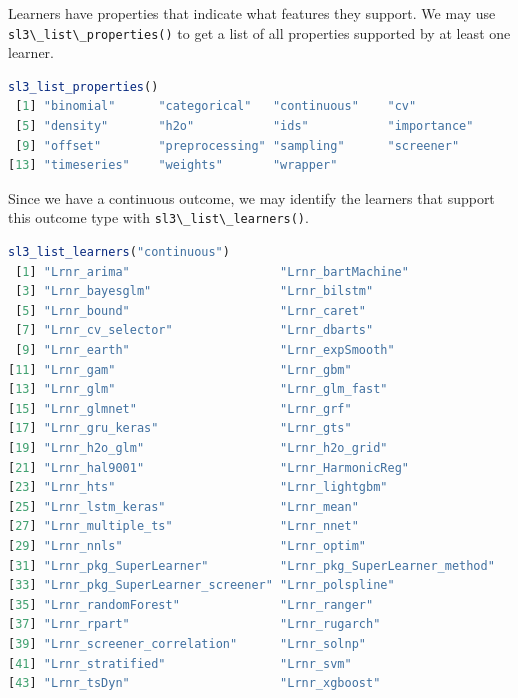\documentclass[
  12pt, krantz2,
]{krantz}
\newcommand{\passthrough}[1]{#1}
\theoremstyle{definition}
\theoremstyle{definition}
\theoremstyle{definition}
\newcommand{\1}{\mathbbm{1}}
\begin{document}
Learners have properties that indicate what features they support. We may use
\passthrough{\lstinline!sl3\_list\_properties()!} to get a list of all properties supported by at least
one learner.

\begin{lstlisting}[language=R]
sl3_list_properties()
 [1] "binomial"      "categorical"   "continuous"    "cv"           
 [5] "density"       "h2o"           "ids"           "importance"   
 [9] "offset"        "preprocessing" "sampling"      "screener"     
[13] "timeseries"    "weights"       "wrapper"      
\end{lstlisting}

Since we have a continuous outcome, we may identify the learners that support
this outcome type with \passthrough{\lstinline!sl3\_list\_learners()!}.

\begin{lstlisting}[language=R]
sl3_list_learners("continuous")
 [1] "Lrnr_arima"                     "Lrnr_bartMachine"              
 [3] "Lrnr_bayesglm"                  "Lrnr_bilstm"                   
 [5] "Lrnr_bound"                     "Lrnr_caret"                    
 [7] "Lrnr_cv_selector"               "Lrnr_dbarts"                   
 [9] "Lrnr_earth"                     "Lrnr_expSmooth"                
[11] "Lrnr_gam"                       "Lrnr_gbm"                      
[13] "Lrnr_glm"                       "Lrnr_glm_fast"                 
[15] "Lrnr_glmnet"                    "Lrnr_grf"                      
[17] "Lrnr_gru_keras"                 "Lrnr_gts"                      
[19] "Lrnr_h2o_glm"                   "Lrnr_h2o_grid"                 
[21] "Lrnr_hal9001"                   "Lrnr_HarmonicReg"              
[23] "Lrnr_hts"                       "Lrnr_lightgbm"                 
[25] "Lrnr_lstm_keras"                "Lrnr_mean"                     
[27] "Lrnr_multiple_ts"               "Lrnr_nnet"                     
[29] "Lrnr_nnls"                      "Lrnr_optim"                    
[31] "Lrnr_pkg_SuperLearner"          "Lrnr_pkg_SuperLearner_method"  
[33] "Lrnr_pkg_SuperLearner_screener" "Lrnr_polspline"                
[35] "Lrnr_randomForest"              "Lrnr_ranger"                   
[37] "Lrnr_rpart"                     "Lrnr_rugarch"                  
[39] "Lrnr_screener_correlation"      "Lrnr_solnp"                    
[41] "Lrnr_stratified"                "Lrnr_svm"                      
[43] "Lrnr_tsDyn"                     "Lrnr_xgboost"                  
\end{lstlisting}
\end{document}

